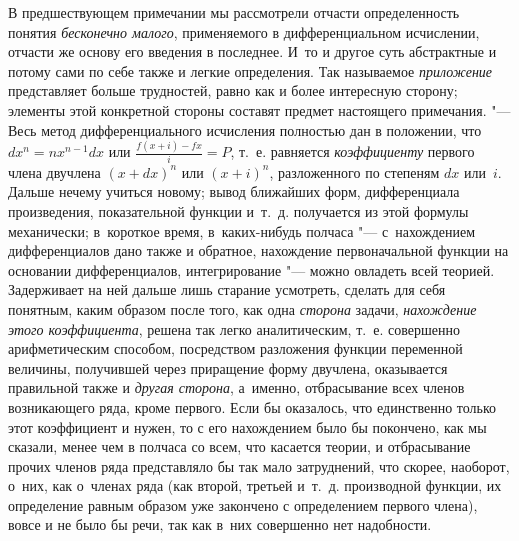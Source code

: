 В предшествующем примечании мы рассмотрели отчасти определенность понятия
{\em бесконечно малого}, применяемого в дифференциальном исчислении, отчасти же
основу его введения в последнее. И~то и другое суть абстрактные и потому сами
по себе также и легкие определения. Так называемое {\em приложение}
представляет больше трудностей, равно как и более интересную сторону; элементы
этой конкретной стороны составят предмет настоящего примечания. "--- Весь метод
дифференциального исчисления полностью дан в положении, что $dx^n=nx^{n-1}dx$
или $\frac{f\left(x+i\right)-fx}i=P$, т.~е. равняется {\em коэффициенту}
первого члена двучлена $(x+dx)^n$ или $(x+i)^n$, разложенного по степеням $dx$ или~$i$. Дальше нечему учиться
новому; вывод ближайших форм, дифференциала произведения, показательной функции
и~т.~д. получается из этой формулы механически; в~короткое время,
в~каких-нибудь полчаса "--- с~нахождением дифференциалов дано также и обратное,
нахождение первоначальной функции на основании дифференциалов, интегрирование
"--- можно овладеть всей теорией. Задерживает на ней дальше лишь старание
усмотреть, сделать для себя понятным, каким образом после того, как одна
{\em сторона} задачи, {\em нахождение этого коэффициента}, решена так легко
аналитическим, т.~е. совершенно арифметическим способом, посредством разложения
функции переменной величины, получившей через приращение форму двучлена,
оказывается правильной также и {\em другая сторона}, а~именно, отбрасывание
всех членов возникающего ряда, кроме первого. Если бы оказалось, что
единственно только этот коэффициент и нужен, то с его нахождением было бы
покончено, как мы сказали, менее чем в полчаса со всем, что касается теории,
и отбрасывание прочих членов ряда представляло бы так мало затруднений, что
скорее, наоборот, о~них, как о~членах ряда (как второй, третьей и~т.~д.
производной функции, их определение равным образом уже закончено с определением
первого члена), вовсе и не было бы речи, так как в~них совершенно нет
надобности.

